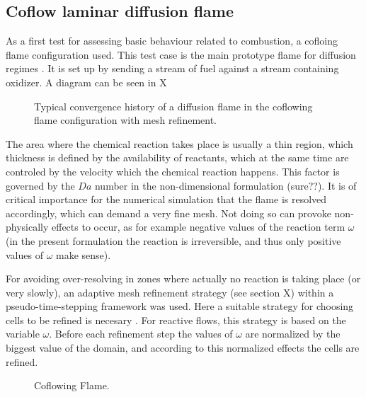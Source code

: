 
\subsection{Coflow laminar diffusion flame}
As a first test for assessing basic behaviour related to combustion, a cofloing flame configuration used. This test case is the main prototype flame for diffusion regimes \cite{poinsotTheoreticalNumericalCombustion2005}. It is set up by sending a stream of fuel against a stream containing oxidizer. A diagram can be seen in X
\begin{figure}[t!]
	\centering
	\caption{Typical convergence history of a diffusion flame in the coflowing flame configuration with mesh refinement.}
	\label{fig:CoFlow_ConvergenceStory}
\end{figure}

The area where the chemical reaction takes place is usually a thin region, which thickness is defined by the availability of reactants, which at the same time are controled by the velocity which the chemical reaction happens. This factor is governed by the $Da$ number in the non-dimensional formulation (sure??). It is of critical importance for the numerical simulation that the flame is resolved accordingly, which can demand a very fine mesh. Not doing so can provoke non-physically effects to occur, as for example negative values of the reaction term $\omega$ (in the present formulation the reaction is irreversible, and thus only positive values of $\omega$ make sense).

For avoiding over-resolving in zones where actually no reaction is taking place (or very slowly), an adaptive mesh refinement strategy  (see section X) within a pseudo-time-stepping framework was used.  Here a  suitable strategy for choosing cells to be refined is necesary . For reactive flows, this strategy is based on the variable $\omega$.
Before each refinement step the values of $\omega$ are normalized by the biggest value of the domain, and according to this normalized effects the cells are refined. %


\begin{figure}
	\centering
	\pgfplotsset{width=0.75 \textwidth, compat=1.3}
	\caption{Coflowing Flame.} \label{fig:CoFlowFlameFig}
\end{figure}

